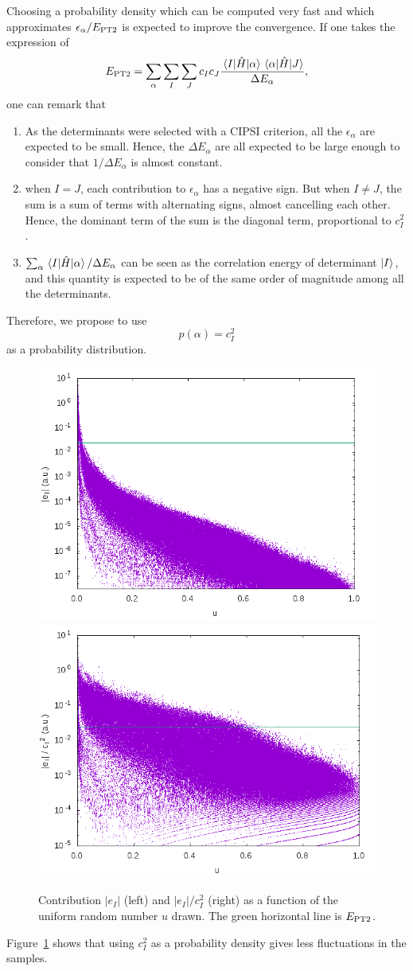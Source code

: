\documentclass[./thesis.tex]{subfiles}
\begin{document}
Choosing a probability density which can be computed very fast and which
approximates $\epsilon_\alpha / E_\text{PT2}$ is expected to improve the convergence.
If one takes the expression of 
\begin{equation}
E_\text{PT2} = \sum_\alpha \sum_I \sum_J c_I c_J \frac{\mel{I}{\hat{H}}{\alpha} \mel{\alpha}{\hat{H}}{J}}{\Delta E_\alpha}, 
\end{equation}
one can remark that
\begin{enumerate}
\item As the determinants were selected with a CIPSI criterion, all the $\epsilon_\alpha$ are expected to be small. Hence, the $\Delta E_\alpha$ are all expected to be large enough to consider that $1/\Delta E_\alpha$ is almost constant.
\item 
when $I=J$, each contribution to $\epsilon_\alpha$ has a negative sign. But when $I \ne J$, the sum is a sum of terms with alternating signs, almost cancelling each other. Hence, the dominant term of the sum is the diagonal term, proportional to $c_I^2$.
\item $\sum_\alpha \mel{I}{\hat{H}}{\alpha} / \Delta E_\alpha$ can be seen as the correlation
energy of determinant ${\ket{I}}$, and this quantity is expected to be of the same order of magnitude among all the determinants.
\end{enumerate}
Therefore, we propose to use 
\begin{equation}
p(\alpha) = {c_I^2}
\end{equation}
as a probability distribution. 
\begin{figure}[h!]
	\begin{center}
		\includegraphics[width=0.49\columnwidth]{figures/pt2/eI}
		\includegraphics[width=0.49\columnwidth]{figures/pt2/eici2}
	\end{center}
		\caption{Contribution $|e_I|$ (left) and $|e_I|/c_I^2$ (right) as a function of the uniform random number $u$ drawn. The green horizontal line is $E_\text{PT2}$.}
		\label{fig:ei}
\end{figure}
Figure~\ref{fig:ei} shows that using $c_I^2$ as a probability density gives less
fluctuations in the samples.
\end{document}
